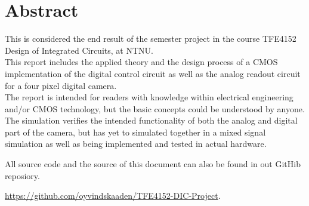 \section*{Abstract}
This is considered the end result of the semester project in the course TFE4152 Design of Integrated Circuits, at NTNU.\\
This report includes the applied theory and the design process of a CMOS implementation of the digital control circuit as well as the analog readout circuit for a four pixel digital camera.\\
The report is intended for readers with knowledge within electrical engineering and/or CMOS technology, but the basic concepts could be understood by anyone.\\
The simulation verifies the intended functionality of both the analog and digital part of the camera, but has yet to simulated together in a mixed signal simulation as well as being implemented and tested in actual hardware. 

All source code and the source of this document can also be found in out GitHib reposiory. 

\url{https://github.com/oyvindskaaden/TFE4152-DIC-Project}.

\clearpage